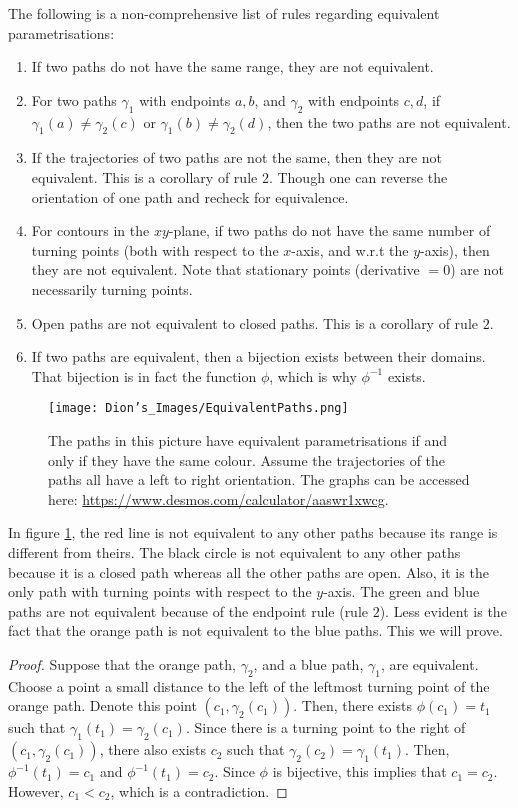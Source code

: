 \begin{defn}
\medskip
The following is a non-comprehensive list of rules regarding equivalent parametrisations:
\begin{enumerate}
\item If two paths do not have the same range, they are not equivalent.
\item For two paths $\gamma_1$ with endpoints $a,b$, and $\gamma_2$ with endpoints $c,d$, if $\gamma_1(a) \neq \gamma_2(c)$ or $\gamma_1(b) \neq \gamma_2(d)$, then the two paths are not equivalent.
\item If the trajectories of two paths are not the same, then they are not equivalent. This is a corollary of rule $2$. 
Though one can reverse the orientation of one path and recheck for equivalence.
\item For contours in the $xy$-plane, if two paths do not have the same number of turning points (both with respect to the $x$-axis, and w.r.t the $y$-axis), then they are not equivalent. 
Note that stationary points (derivative $= 0$) are not necessarily turning points.
\item Open paths are not equivalent to closed paths. This is a corollary of rule $2$.
\item If two paths are equivalent, then a bijection exists between their domains. 
That bijection is in fact the function $\phi$, which is why $\phi^{-1}$ exists.
\end{enumerate}

\begin{figure}[h]
\centering
\texttt{[image: Dion's\_Images/EquivalentPaths.png]}
\caption{The paths in this picture have equivalent parametrisations if and only if they have the same colour. Assume the trajectories of the paths all have a left to right orientation. 
The graphs can be accessed here: \url{https://www.desmos.com/calculator/aaswr1xwcg}.}
\label{EquivalentPaths}
\end{figure}

In figure \ref{EquivalentPaths}, the red line is not equivalent to any other paths because its range is different from theirs.
The black circle is not equivalent to any other paths because it is a closed path whereas all the other paths are open. Also, it is the only path with turning points with respect to the $y$-axis.
The green and blue paths are not equivalent because of the endpoint rule (rule $2$).
Less evident is the fact that the orange path is not equivalent to the blue paths. This we will prove.
\begin{proof}
Suppose that the orange path, $\gamma_2$, and a blue path, $\gamma_1$, are equivalent.
Choose a point a small distance to the left of the leftmost turning point of the orange path. Denote this point $(c_1, \gamma_2(c_1))$. Then, there exists $\phi(c_1) = t_1$ such that $\gamma_1(t_1) = \gamma_2(c_1)$.
Since there is a turning point to the right of $(c_1, \gamma_2(c_1))$, there also exists $c_2$ such that $\gamma_2(c_2) = \gamma_1(t_1)$.
Then, $\phi^{-1}(t_1) = c_1$ and $\phi^{-1}(t_1) = c_2$. Since $\phi$ is bijective, this implies that $c_1 = c_2$. However, $c_1 < c_2$, which is a contradiction.
\end{proof}


\end{defn}
